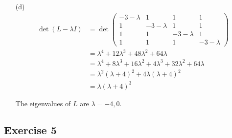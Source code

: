 \documentclass{article}
\begin{document}
\begin{enumerate}
  \item[(d)]
  \begin{align*}
    \det(L - \lambda I) &= \det
    \begin{pmatrix}
      -3 - \lambda & 1 & 1 & 1 \\
      1 & -3 - \lambda & 1 & 1 \\
      1 & 1 & -3 - \lambda & 1 \\
      1 & 1 & 1 & -3 - \lambda
    \end{pmatrix} \\
    &= \lambda^4 + 12\lambda^3 + 48\lambda^2 + 64\lambda \\
    &= \lambda^4 + 8\lambda^3 + 16\lambda^2 + 4\lambda^3 + 32\lambda^2 + 64\lambda \\
    &= \lambda^2 (\lambda + 4)^2 + 4\lambda (\lambda + 4)^2 \\
    &= \lambda (\lambda + 4)^3
  \end{align*}

  The eigenvalues of \( L \) are \( \lambda = -4, 0 \).
\end{enumerate}

\newpage

\subsection*{Exercise 5}
\end{document}
